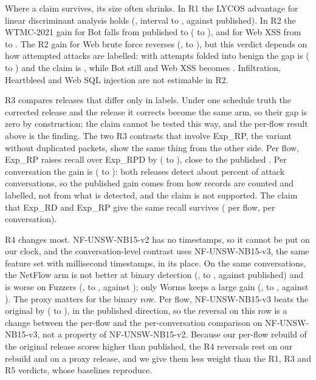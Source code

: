 Where a claim survives, its size often shrinks. In R1 the LYCOS advantage for linear discriminant analysis holds (\RQfiveLdaConv{}, interval \RQfiveLdaConvLo{} to \RQfiveLdaConvHi{}, against \RQfiveLdaPub{} published). In R2 the WTMC-2021 gain for Bot falls from \RQfiveBotPub{} published to \RQfiveBotConv{} (\RQfiveBotConvLo{} to \RQfiveBotConvHi{}), and for Web XSS from \RQfiveXssPub{} to \RQfiveXssConv{}. The R2 gain for Web brute force reverses (\RQfiveWebBfConv{}, \RQfiveWebBfConvLo{} to \RQfiveWebBfConvHi{}), but this verdict depends on how attempted attacks are labelled: with attempts folded into benign the gap is \RQfiveFoldWebBfConv{} (\RQfiveFoldWebBfConvLo{} to \RQfiveFoldWebBfConvHi{}) and the claim is \RQfiveFoldWebBfVerdict{}, while Bot still \RQfiveFoldBotVerdict{} and Web XSS becomes \RQfiveFoldXssVerdict{}. Infiltration, Heartbleed and Web SQL injection are not estimable in R2.

R3 compares releases that differ only in labels. Under one schedule truth the corrected release and the release it corrects become the same arm, so their gap is zero by construction; the claim cannot be tested this way, and the per-flow result above is the finding. The two R3 contrasts that involve Exp\_RP, the variant without duplicated packets, show the same thing from the other side. Per flow, Exp\_RP raises recall over Exp\_RPD by \RQfiveQthreeFlow{} (\RQfiveQthreeFlowLo{} to \RQfiveQthreeFlowHi{}), close to the published \RQfiveQthreePub{}. Per conversation the gain is \RQfiveQthreeConv{} (\RQfiveQthreeConvLo{} to \RQfiveQthreeConvHi{}): both releases detect about \RQfiveQthreeRecall{} percent of attack conversations, so the published gain comes from how records are counted and labelled, not from what is detected, and the claim is not supported. The claim that Exp\_RD and Exp\_RP give the same recall survives (\RQfiveQfourFlow{} per flow, \RQfiveQfourConv{} per conversation).

R4 changes most. NF-UNSW-NB15-v2 has no timestamps, so it cannot be put on our clock, and the conversation-level contrast uses NF-UNSW-NB15-v3, the same feature set with millisecond timestamps, in its place. On the same conversations, the NetFlow arm is not better at binary detection (\RQfiveBinConv{}, \RQfiveBinConvLo{} to \RQfiveBinConvHi{}, against \RQfiveBinPub{} published) and is worse on Fuzzers (\RQfiveFuzzConv{}, \RQfiveFuzzConvLo{} to \RQfiveFuzzConvHi{}, against \RQfiveFuzzPub{}); only Worms keeps a large gain (\RQfiveWormsConv{}, \RQfiveWormsConvLo{} to \RQfiveWormsConvHi{}, against \RQfiveWormsPub{}). The proxy matters for the binary row. Per flow, NF-UNSW-NB15-v3 beats the original by \RQfiveBinVthreeFlow{} (\RQfiveBinVthreeFlowLo{} to \RQfiveBinVthreeFlowHi{}), in the published direction, so the reversal on this row is a change between the per-flow and the per-conversation comparison on NF-UNSW-NB15-v3, not a property of NF-UNSW-NB15-v2. Because our per-flow rebuild of the original release scores higher than published, the R4 reversals rest on our rebuild and on a proxy release, and we give them less weight than the R1, R3 and R5 verdicts, whose baselines reproduce.

